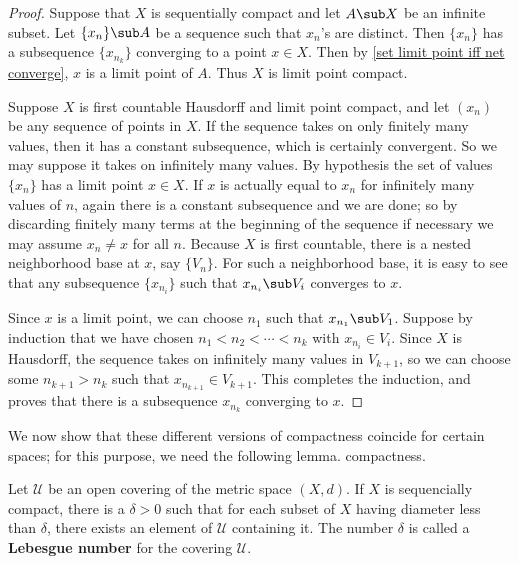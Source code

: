 \begin{proof}
Suppose that $X$ is sequentially compact and let $A\sub X$ be an infinite subset. Let $\{x_n\}\sub A$ be a sequence such that $x_n$'s are distinct. Then $\{x_n\}$ has a subsequence $\{x_{n_k}\}$ converging to a point $x\in X$. Then by \cref{set limit point iff net converge}, $x$ is a limit point of $A$. Thus $X$ is limit point compact.\par
Suppose $X$ is first countable Hausdorff and limit point compact, and let $(x_n)$ be any sequence of points in $X$. If the sequence takes on only finitely many values, then it has a constant subsequence, which is certainly convergent. So we may suppose it takes on infinitely many values. By hypothesis the set of values $\{x_n\}$ has a limit point $x\in X$. If $x$ is actually equal to $x_n$ for infinitely many values of $n$, again there is a constant subsequence and we are done; so by discarding finitely many terms at the beginning of the sequence if necessary we may assume $x_n\neq x$ for all $n$. Because $X$ is first countable, there is a nested neighborhood base at $x$, say $\{V_n\}$. For such a neighborhood base, it is easy to see that any subsequence $\{x_{n_i}\}$ such that $x_{n_i}\sub V_i$ converges to $x$.\par
Since $x$ is a limit point, we can choose $n_1$ such that $x_{n_1}\sub V_1$. Suppose by induction that we have chosen $n_1<n_2<\cdots<n_k$ with $x_{n_i}\in V_i$. Since $X$ is Hausdorff, the sequence takes on infinitely many values in $V_{k+1}$, so we can choose some $n_{k+1}>n_k$ such that $x_{n_{k+1}}\in V_{k+1}$. This completes the induction, and proves that there is a subsequence $x_{n_k}$ converging to $x$.
\end{proof}
We now show that these different versions of compactness coincide for certain spaces; for this purpose, we need the following lemma.
compactness.
\begin{lemma}
Let $\mathcal{U}$ be an open covering of the metric space $(X,d)$. If $X$ is sequencially compact, there is a $\delta>0$ such that for each subset of $X$ having diameter less than $\delta$, there exists an element of $\mathcal{U}$ containing it. The number $\delta$ is called a \textbf{Lebesgue number} for the covering $\mathcal{U}$.
\end{lemma}
